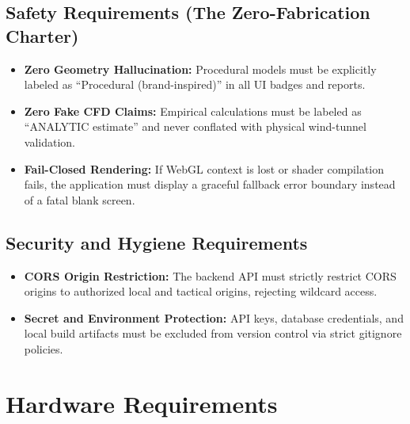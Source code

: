 \documentclass[12pt,a4paper]{report}
\begin{document}
\subsection{Safety Requirements (The Zero-Fabrication Charter)}
\begin{itemize}
    \item \textbf{Zero Geometry Hallucination:} Procedural models must be explicitly labeled as ``Procedural (brand-inspired)'' in all UI badges and reports.
    \item \textbf{Zero Fake CFD Claims:} Empirical calculations must be labeled as ``ANALYTIC estimate'' and never conflated with physical wind-tunnel validation.
    \item \textbf{Fail-Closed Rendering:} If WebGL context is lost or shader compilation fails, the application must display a graceful fallback error boundary instead of a fatal blank screen.
\end{itemize}

\subsection{Security and Hygiene Requirements}
\begin{itemize}
    \item \textbf{CORS Origin Restriction:} The backend API must strictly restrict CORS origins to authorized local and tactical origins, rejecting wildcard access.
    \item \textbf{Secret and Environment Protection:} API keys, database credentials, and local build artifacts must be excluded from version control via strict gitignore policies.
\end{itemize}

\section{Hardware Requirements}
\end{document}
